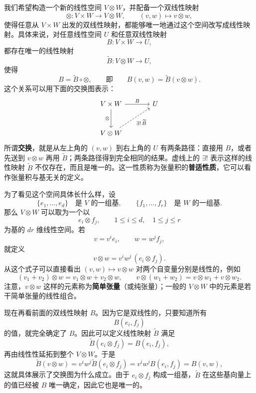 \documentclass[UTF8,11pt,a4paper,fontset=fandol]{ctexart}
\numberwithin{equation}{section}
\begin{document}
我们希望构造一个新的线性空间 $V\otimes W$，并配备一个双线性映射
\begin{equation}
    \otimes:V\times W\longrightarrow V\otimes W,
    \qquad (v,w)\longmapsto v\otimes w,
\end{equation}
使得任意从 $V\times W$ 出发的双线性映射，都能够唯一地通过这个空间改写成线性映射。具体来说，对任意线性空间 $U$ 和任意双线性映射
\[
B:V\times W\longrightarrow U,
\]
都存在唯一的线性映射
\[
\widetilde B:V\otimes W\longrightarrow U,
\]
使得
\begin{equation}
    B=\widetilde B\circ\otimes,
    \qquad\text{即}\qquad
    B(v,w)=\widetilde B(v\otimes w).
\end{equation}
这个关系可以用下面的交换图表示：
\[
\begin{tikzcd}[column sep=large,row sep=large]
V\times W \arrow[r,"B"] \arrow[d,"\otimes"'] & U \\
V\otimes W \arrow[ur,dashed,"\exists!\,\widetilde B"'] &
\end{tikzcd}
\]
所谓\textbf{交换}，就是从左上角的 $(v,w)$ 到右上角的 $U$ 有两条路径：直接用 $B$，或者先送到 $v\otimes w$ 再用 $\widetilde B$；两条路径得到完全相同的结果。虚线上的 $\exists!$ 表示这样的线性映射 $\widetilde B$ 不仅存在，而且是唯一的。这一性质称为张量积的\textbf{普适性质}，它可以看作张量积与基无关的定义。

为了看见这个空间具体长什么样，设
\[
\{e_1,\ldots,e_d\}\quad\text{是 }V\text{ 的一组基},
\qquad
\{f_1,\ldots,f_r\}\quad\text{是 }W\text{ 的一组基}.
\]
那么 $V\otimes W$ 可以取为一个以
\[
e_i\otimes f_j,\qquad 1\le i\le d,\quad 1\le j\le r
\]
为基的 $dr$ 维线性空间。若
\[
v=v^i e_i,\qquad w=w^j f_j,
\]
就定义
\begin{equation}
    v\otimes w=v^i w^j\,(e_i\otimes f_j).
\end{equation}
从这个式子可以直接看出 $(v,w)\mapsto v\otimes w$ 对两个自变量分别是线性的，例如
\[
(v_1+v_2)\otimes w=v_1\otimes w+v_2\otimes w,
\qquad
v\otimes(w_1+w_2)=v\otimes w_1+v\otimes w_2.
\]
注意，$v\otimes w$ 这样的元素称为\textbf{简单张量}（或纯张量）；一般的 $V\otimes W$ 中的元素是若干简单张量的线性组合。

现在再看前面的双线性映射 $B$。因为它是双线性的，只要知道所有
\[
B(e_i,f_j)
\]
的值，就完全确定了 $B$。因此可以定义线性映射 $\widetilde B$ 满足
\begin{equation}
    \widetilde B(e_i\otimes f_j)=B(e_i,f_j),
\end{equation}
再由线性性延拓到整个 $V\otimes W$。于是
\[
\widetilde B(v\otimes w)
=v^i w^j\widetilde B(e_i\otimes f_j)
=v^i w^j B(e_i,f_j)
=B(v,w),
\]
这就具体展示了交换图为什么成立。由于 $e_i\otimes f_j$ 构成一组基，$\widetilde B$ 在这些基向量上的值已经被 $B$ 唯一确定，因此它也是唯一的。
\end{document}
